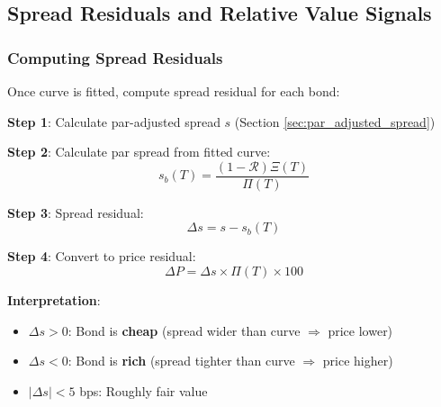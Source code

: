 \documentclass[11pt,a4paper]{article}
\begin{document}
\subsection{Spread Residuals and Relative Value Signals}

\subsubsection{Computing Spread Residuals}

\begin{keybox}
Once curve is fitted, compute spread residual for each bond:

\textbf{Step 1}: Calculate par-adjusted spread $s$ (Section \ref{sec:par_adjusted_spread})

\textbf{Step 2}: Calculate par spread from fitted curve:
\begin{equation}
s_b(T) = \frac{(1 - \mathcal{R})\Xi(T)}{\Pi(T)}
\end{equation}

\textbf{Step 3}: Spread residual:
\begin{equation}
\Delta s = s - s_b(T)
\end{equation}

\textbf{Step 4}: Convert to price residual:
\begin{equation}
\Delta P = \Delta s \times \Pi(T) \times 100
\end{equation}

\textbf{Interpretation}:
\begin{itemize}
    \item $\Delta s > 0$: Bond is \textbf{cheap} (spread wider than curve $\Rightarrow$ price lower)
    \item $\Delta s < 0$: Bond is \textbf{rich} (spread tighter than curve $\Rightarrow$ price higher)
    \item $|\Delta s| < 5$ bps: Roughly fair value
\end{itemize}
\end{keybox}
\end{document}
